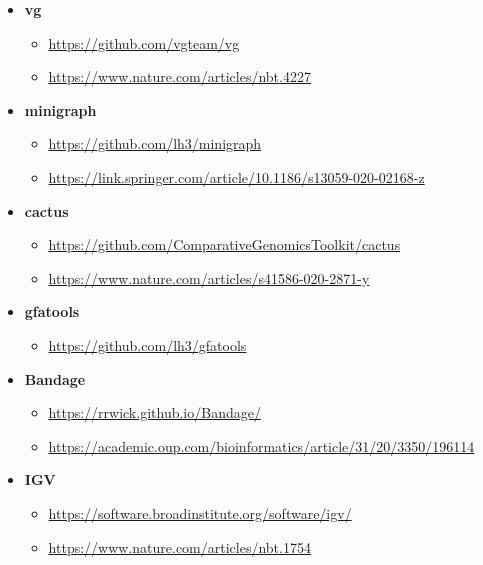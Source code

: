 \documentclass[
]{book}
\providecommand{\tightlist}{%
  \setlength{\itemsep}{0pt}\setlength{\parskip}{0pt}}
\begin{document}
\begin{itemize}
\tightlist
\item
  \textbf{vg}

  \begin{itemize}
  \tightlist
  \item
    \url{https://github.com/vgteam/vg}
  \item
    \url{https://www.nature.com/articles/nbt.4227}
  \end{itemize}
\item
  \textbf{minigraph}

  \begin{itemize}
  \tightlist
  \item
    \url{https://github.com/lh3/minigraph}
  \item
    \url{https://link.springer.com/article/10.1186/s13059-020-02168-z}
  \end{itemize}
\item
  \textbf{cactus}

  \begin{itemize}
  \tightlist
  \item
    \url{https://github.com/ComparativeGenomicsToolkit/cactus}
  \item
    \url{https://www.nature.com/articles/s41586-020-2871-y}
  \end{itemize}
\item
  \textbf{gfatools}

  \begin{itemize}
  \tightlist
  \item
    \url{https://github.com/lh3/gfatools}
  \end{itemize}
\item
  \textbf{Bandage}

  \begin{itemize}
  \tightlist
  \item
    \url{https://rrwick.github.io/Bandage/}
  \item
    \url{https://academic.oup.com/bioinformatics/article/31/20/3350/196114}
  \end{itemize}
\item
  \textbf{IGV}

  \begin{itemize}
  \tightlist
  \item
    \url{https://software.broadinstitute.org/software/igv/}
  \item
    \url{https://www.nature.com/articles/nbt.1754}
  \end{itemize}
\end{itemize}
\end{document}
